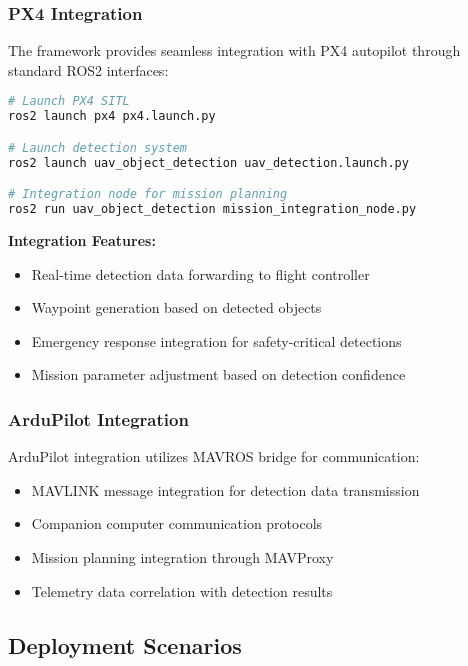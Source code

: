 \documentclass[12pt,a4paper]{article}
\begin{document}
\subsubsection{PX4 Integration}

The framework provides seamless integration with PX4 autopilot through standard ROS2 interfaces:

\begin{lstlisting}[language=bash, caption=PX4 Integration Example]
# Launch PX4 SITL
ros2 launch px4 px4.launch.py

# Launch detection system
ros2 launch uav_object_detection uav_detection.launch.py

# Integration node for mission planning
ros2 run uav_object_detection mission_integration_node.py
\end{lstlisting}

\textbf{Integration Features:}
\begin{itemize}
    \item Real-time detection data forwarding to flight controller
    \item Waypoint generation based on detected objects
    \item Emergency response integration for safety-critical detections
    \item Mission parameter adjustment based on detection confidence
\end{itemize}

\subsubsection{ArduPilot Integration}

ArduPilot integration utilizes MAVROS bridge for communication:

\begin{itemize}
    \item MAVLINK message integration for detection data transmission
    \item Companion computer communication protocols
    \item Mission planning integration through MAVProxy
    \item Telemetry data correlation with detection results
\end{itemize}

\subsection{Deployment Scenarios}
\end{document}
